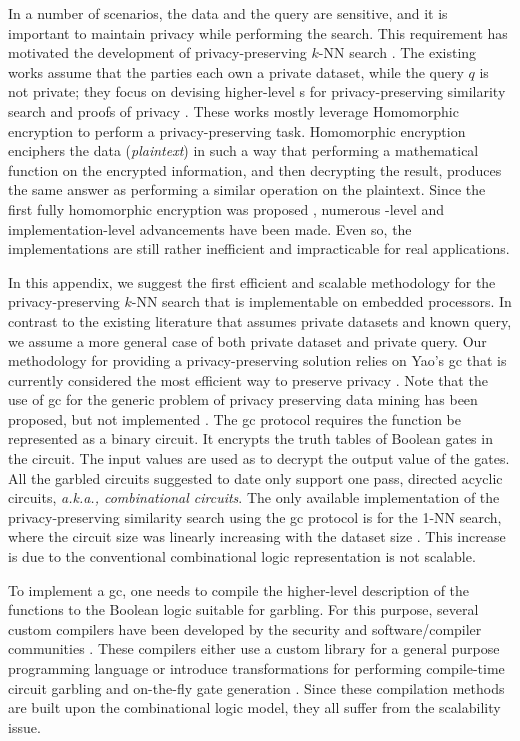 In a number of scenarios, the data and the query are sensitive, and it is important to maintain privacy while performing the search.
This requirement has motivated the development of privacy-preserving $k$-NN search \cite{shaneck2009privacy}.
The existing works assume that the parties each own a private dataset, while the query $q$ is not private; they focus on devising higher-level  s for privacy-preserving similarity search and proofs of privacy \cite{shaneck2009privacy,qi2008efficient}.
These works mostly leverage Homomorphic encryption to perform a privacy-preserving task.
Homomorphic encryption enciphers the data (\emph{plaintext}) in such a way that performing a mathematical function on the encrypted information, and then decrypting the result, produces the same answer as performing a similar operation on the plaintext.
Since the first fully homomorphic encryption was proposed \cite{gentry2009fully}, numerous  -level and implementation-level advancements have been made.
Even so, the implementations are still rather inefficient and impracticable for real applications.

In this appendix, we suggest the first efficient and scalable methodology for the privacy-preserving $k$-NN search that is implementable on embedded processors.
In contrast to the existing literature that assumes private datasets and known query, we assume a more general case of both private dataset and private query.
Our methodology for providing a privacy-preserving solution relies on Yao's \acrfull{gc} that is currently considered the most efficient way to preserve privacy \cite{huang2012private,brenner2011hcrypt}.
Note that the use of \acrshort{gc} for the generic problem of privacy preserving data mining has been proposed, but not implemented \cite{agrawal2000privacy}.
The \acrshort{gc} protocol requires the function be represented as a binary circuit.
It encrypts the truth tables of Boolean gates in the circuit.
The input values are used as to decrypt the output value of the gates.
All the garbled circuits suggested to date only support one pass, directed acyclic circuits, \emph{a.k.a., combinational circuits}.
The only available implementation of the privacy-preserving similarity search using the \acrshort{gc} protocol is for the 1-NN search, where the circuit size was linearly increasing with the dataset size \cite{kolesnikov2009improved}.
This increase is due to the conventional combinational logic representation is not scalable.

To implement a \acrshort{gc}, one needs to compile the higher-level description of the functions to the Boolean logic suitable for garbling.
For this purpose, several custom compilers have been developed by the security and software/compiler communities \cite{malkhi2004fairplay,henecka2010tasty,holzer2012secure,kreuter2013pcf}.
These compilers either use a custom library for a general purpose programming language \cite{malkhi2004fairplay} or introduce transformations for performing compile-time circuit garbling and on-the-fly gate generation \cite{kreuter2013pcf}.
Since these compilation methods are built upon the combinational logic model, they all suffer from the scalability issue.

